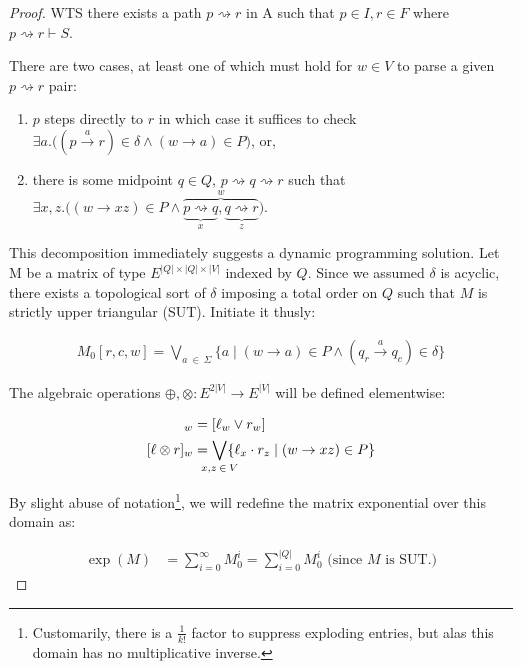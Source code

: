 \documentclass[sigplan,review,acmsmall,nonacm,screen,anonymous]{acmart}\settopmatter{printfolios=false,printccs=false,printacmref=false}
\begin{document}
\begin{proof}[Proof]
  WTS there exists a path $p \rightsquigarrow r$ in A such that $p\in I, r\in F$ where $p \rightsquigarrow r \vdash S$.\vspace{0.3cm}

  \noindent There are two cases, at least one of which must hold for $w \in V$ to parse a given $p \rightsquigarrow r$ pair:

  \begin{enumerate}
    \item $p$ steps directly to $r$ in which case it suffices to check $\exists a.\big((p \overset{a}{\rightarrow} r)\in \delta \land (w \rightarrow a) \in P\big)$, or,
    \item there is some midpoint $q \in Q$, $p \rightsquigarrow q \rightsquigarrow r$ such that $\exists x, z.\big((w \rightarrow xz) \in P\land\overbrace{\underbrace{p \rightsquigarrow q}_x, \underbrace{q \rightsquigarrow r}_z}^w\big)$.
  \end{enumerate}

  \noindent This decomposition immediately suggests a dynamic programming solution. Let M be a matrix of type $E^{|Q|\times|Q|\times|V|}$  indexed by $Q$. Since we assumed $\delta$ is acyclic, there exists a topological sort of $\delta$ imposing a total order on $Q$ such that $M$ is strictly upper triangular (SUT). Initiate it thusly:

  \begin{align}
    M_0[r, c, w] = \bigvee_{a\:\in\:\Sigma} \{a \mid (w \rightarrow a) \in P \land (q_r \overset{a}{\rightarrow} q_c)\in \delta\}
  \end{align}

  \noindent The algebraic operations $\oplus, \otimes: E^{2|V|} \rightarrow E^{|V|}$ will be defined elementwise:

  \begin{align}
    [\ell \oplus r]_w  &= [\ell_w \lor r_w]\\
    [\ell \otimes r]_w &= \bigvee_{\mathclap{x, z\:\in\:V}}\{\ell_x \cdot r_z \mid (w \rightarrow xz) \in P\}
  \end{align}

  \noindent By slight abuse of notation\footnote{Customarily, there is a $\frac{1}{k!}$ factor to suppress exploding entries, but alas this domain has no multiplicative inverse.}, we will redefine the matrix exponential over this domain as:

  \begin{align}
    \exp(M) &= \sum_{i = 0}^\infty M_0^i = \sum_{i = 0}^{|Q|} M_0^i \text { (since $M$ is SUT.)}
  \end{align}


\end{proof}
\end{document}
